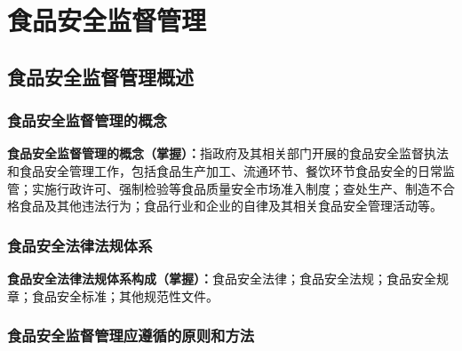 \chapter{食品安全监督管理}
\setcounter{chapter}{13}

\section{食品安全监督管理概述}

\subsection{食品安全监督管理的概念}

\begin{keybox}
\textbf{食品安全监督管理的概念（掌握）：}指政府及其相关部门开展的食品安全监督执法和食品安全管理工作，包括食品生产加工、流通环节、餐饮环节食品安全的日常监管；实施行政许可、强制检验等食品质量安全市场准入制度；查处生产、制造不合格食品及其他违法行为；食品行业和企业的自律及其相关食品安全管理活动等。
\end{keybox}

\subsection{食品安全法律法规体系}

\begin{keybox}
\textbf{食品安全法律法规体系构成（掌握）：}食品安全法律；食品安全法规；食品安全规章；食品安全标准；其他规范性文件。
\end{keybox}

\subsection{食品安全监督管理应遵循的原则和方法}

